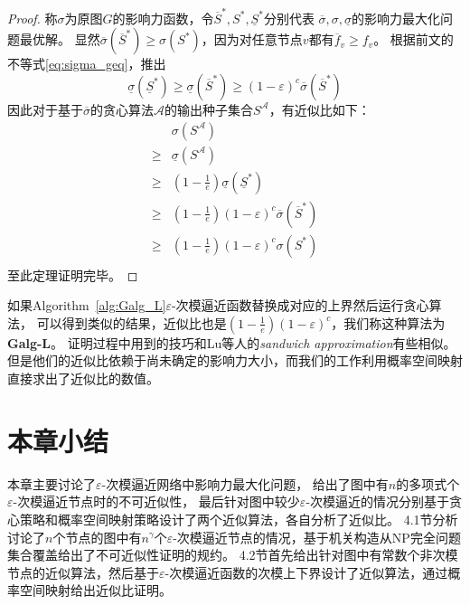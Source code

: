 \begin{proof}
称$\sigma$为原图$G$的影响力函数，令$\overline{S}^*,S^*,\underline{S}^*$分别代表
$\overline{\sigma}, \sigma, \underline{\sigma}$的影响力最大化问题最优解。
显然$\overline{\sigma}(\overline{S}^*) \geq \sigma(S^*)$，因为对任意节点$v$都有$\overline{f}_v \geq f_v$。
根据前文的不等式\ref{eq:sigma_geq}，推出
$$\underline{\sigma}(\underline{S}^*)
\geq \underline{\sigma}(\overline{S}^*)
\geq (1-\varepsilon)^c \overline{\sigma}(\overline{S}^*)$$
因此对于基于$\overline{\sigma}$的贪心算法$\mathcal{A}$的输出种子集合$S^{\mathcal{A}}$，有近似比如下：
\begin{equation*}
\begin{array}{ll}
& \sigma(S^{\mathcal{A}}) \\
\geq & \underline{\sigma}(S^{\mathcal{A}}) \\
\geq & (1-\frac{1}{e})\underline{\sigma}(\underline{S}^*)\\
\geq & (1-\frac{1}{e})(1-\varepsilon)^c \overline{\sigma}(\overline{S}^*) \\
\geq &(1-\frac{1}{e})(1-\varepsilon)^c \sigma(S^*) \\
\end{array}
\end{equation*}
至此定理证明完毕。
\end{proof}

如果Algorithm~\ref{alg:Galg_L}$\varepsilon$-次模逼近函数替换成对应的上界然后运行贪心算法，
可以得到类似的结果，近似比也是$(1-\frac{1}{e})(1-\varepsilon)^c$，我们称这种算法为\textbf{Galg-L}。
证明过程中用到的技巧和Lu等人\cite{lu2015competition}的{\em sandwich approximation}有些相似。
但是他们的近似比依赖于尚未确定的影响力大小，而我们的工作利用概率空间映射直接求出了近似比的数值。


\section{本章小结}
本章主要讨论了$\varepsilon$-次模逼近网络中影响力最大化问题，
给出了图中有$n$的多项式个$\varepsilon$-次模逼近节点时的不可近似性，
最后针对图中较少$\varepsilon$-次模逼近的情况分别基于贪心策略和概率空间映射策略设计了两个近似算法，各自分析了近似比。
4.1节分析讨论了$n$个节点的图中有$n^{\gamma}$个$\varepsilon$-次模逼近节点的情况，基于机关构造从NP完全问题集合覆盖给出了不可近似性证明的规约。
4.2节首先给出针对图中有常数个非次模节点的近似算法，然后基于$\varepsilon$-次模逼近函数的次模上下界设计了近似算法，通过概率空间映射给出近似比证明。







